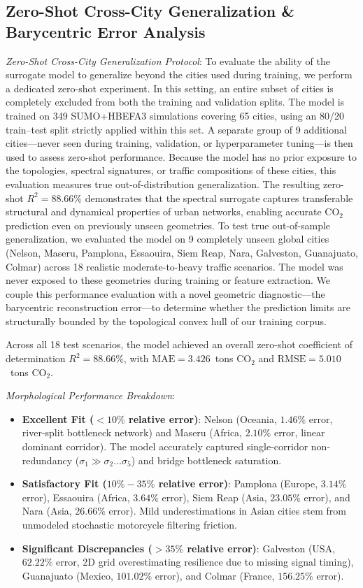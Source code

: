 \documentclass[lettersize,journal]{IEEEtran}
\begin{document}
\subsection{Zero-Shot Cross-City Generalization \& Barycentric Error Analysis}
\textit{Zero-Shot Cross-City Generalization Protocol}: To evaluate the ability of the surrogate model to generalize beyond the cities used during training, we perform a dedicated zero-shot experiment. In this setting, an entire subset of cities is completely excluded from both the training and validation splits. The model is trained on 349 SUMO+HBEFA3 simulations covering 65 cities, using an 80/20 train--test split strictly applied within this set. A separate group of 9 additional cities---never seen during training, validation, or hyperparameter tuning---is then used to assess zero-shot performance. Because the model has no prior exposure to the topologies, spectral signatures, or traffic compositions of these cities, this evaluation measures true out-of-distribution generalization. The resulting zero-shot $R^2 = 88.66\%$ demonstrates that the spectral surrogate captures transferable structural and dynamical properties of urban networks, enabling accurate $\text{CO}_2$ prediction even on previously unseen geometries.
To test true out-of-sample generalization, we evaluated the model on 9 completely unseen global cities (Nelson, Maseru, Pamplona, Essaouira, Siem Reap, Nara, Galveston, Guanajuato, Colmar) across 18 realistic moderate-to-heavy traffic scenarios. The model was never exposed to these geometries during training or feature extraction. We couple this performance evaluation with a novel geometric diagnostic—the barycentric reconstruction error—to determine whether the prediction limits are structurally bounded by the topological convex hull of our training corpus.

Across all 18 test scenarios, the model achieved an overall zero-shot coefficient of determination $R^2 = 88.66\%$, with $\text{MAE} = 3.426$~tons $\text{CO}_2$ and $\text{RMSE} = 5.010$~tons $\text{CO}_2$. 

\textit{Morphological Performance Breakdown}:
\begin{itemize}
    \item \textbf{Excellent Fit ($<10\%$ relative error)}: Nelson (Oceania, $1.46\%$ error, river-split bottleneck network) and Maseru (Africa, $2.10\%$ error, linear dominant corridor). The model accurately captured single-corridor non-redundancy ($\sigma_1 \gg \sigma_2 \dots \sigma_5$) and bridge bottleneck saturation.
    \item \textbf{Satisfactory Fit ($10\% - 35\%$ relative error)}: Pamplona (Europe, $3.14\%$ error), Essaouira (Africa, $3.64\%$ error), Siem Reap (Asia, $23.05\%$ error), and Nara (Asia, $26.66\%$ error). Mild underestimations in Asian cities stem from unmodeled stochastic motorcycle filtering friction.
    \item \textbf{Significant Discrepancies ($>35\%$ relative error)}: Galveston (USA, $62.22\%$ error, 2D grid overestimating resilience due to missing signal timing), Guanajuato (Mexico, $101.02\%$ error), and Colmar (France, $156.25\%$ error). 
\end{itemize}
\end{document}
